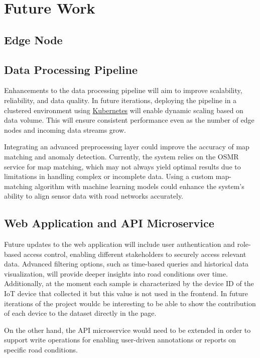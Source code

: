 \section{Future Work}

\subsection{Edge Node}

\subsection{Data Processing Pipeline}

Enhancements to the data processing pipeline will aim to improve scalability, reliability, and data quality. In future iterations, deploying the pipeline in a clustered environment using \href{https://kubernetes.io/}{Kubernetes} will enable dynamic scaling based on data volume. This will ensure consistent performance even as the number of edge nodes and incoming data streams grow.

Integrating an advanced preprocessing layer could improve the accuracy of map matching and anomaly detection. Currently, the system relies on the OSMR service for map matching, which may not always yield optimal results due to limitations in handling complex or incomplete data. Using a custom map-matching algorithm with machine learning models could enhance the system's ability to align sensor data with road networks accurately.

\subsection{Web Application and API Microservice}

Future updates to the web application will include user authentication and role-based access control, enabling different stakeholders to securely access relevant data. Advanced filtering options, such as time-based queries and historical data visualization, will provide deeper insights into road conditions over time. Additionally, at the moment each sample is characterized by the device ID of the IoT device that collected it but this value is not used in the frontend. In future iterations of the project wouldc be interesting to be able to show the contribution of each device to the dataset directly in the page.

On the other hand, the API microservice would need to be extended in order to support write operations for enabling user-driven annotations or reports on specific road conditions.

